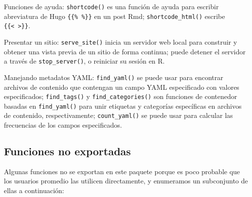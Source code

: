 \documentclass[12pt,]{krantz}
\theoremstyle{definition}
\theoremstyle{definition}
\theoremstyle{definition}
\theoremstyle{remark}
\begin{document}
Funciones de ayuda: \texttt{shortcode()} es una función de ayuda para
escribir abreviatura de Hugo \texttt{\{\{\%\ \%\}\}} en un post Rmd;
\texttt{shortcode\_html()} escribe
\texttt{\{\{\textless{}\ \textgreater{}\}\}}.

Presentar un sitio: \texttt{serve\_site()} inicia un servidor web local
para construir y obtener una vista previa de un sitio de forma continua;
puede detener el servidor a través de \texttt{stop\_server()}, o
reiniciar su sesión en R.

Manejando metadatos YAML: \texttt{find\_yaml()} se puede usar para
encontrar archivos de contenido que contengan un campo YAML especificado
con valores especificados; \texttt{find\_tags()} y
\texttt{find\_categories()} son funciones de contenedor basadas en
\texttt{find\_yaml()} para unir etiquetas y categorías específicas en
archivos de contenido, respectivamente; \texttt{count\_yaml()} se puede
usar para calcular las frecuencias de los campos especificados.

\hypertarget{funciones-no-exportadas}{%
\subsection{Funciones no exportadas}\label{funciones-no-exportadas}}

Algunas funciones no se exportan en este paquete porque es poco probable
que los usuarios promedio las utilicen directamente, y enumeramos un
subconjunto de ellas a continuación:
\end{document}

